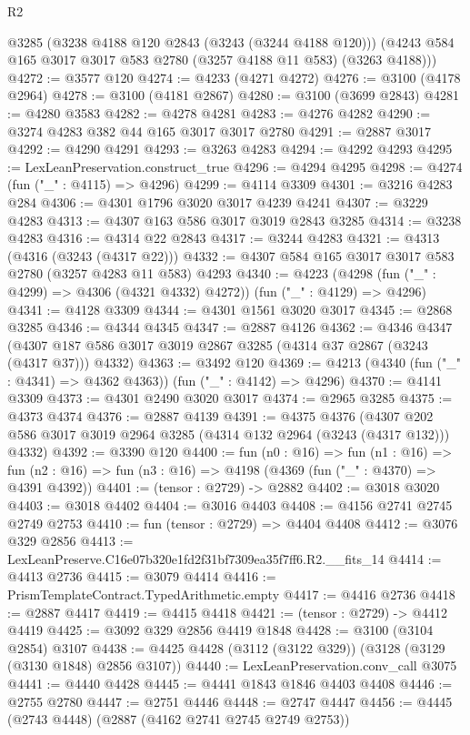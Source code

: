 \begin{lexlean}{R2}
\begin{coremodule}
      @3285
      (@3238 @4188 @120 @2843 (@3243 (@3244 @4188 @120)))
      (@4243 @584 @165 @3017 @3017 @583 @2780 (@3257 @4188 @11 @583) (@3263 @4188)))
@4272 := @3577 @120
@4274 := @4233 (@4271 @4272)
@4276 := @3100 (@4178 @2964)
@4278 := @3100 (@4181 @2867)
@4280 := @3100 (@3699 @2843)
@4281 := @4280 @3583
@4282 := @4278 @4281
@4283 := @4276 @4282
@4290 := @3274 @4283 @382 @44 @165 @3017 @3017 @2780
@4291 := @2887 @3017
@4292 := @4290 @4291
@4293 := @3263 @4283
@4294 := @4292 @4293
@4295 := LexLeanPreservation.construct_true
@4296 := @4294 @4295
@4298 := @4274 (fun ("_" : @4115) => @4296)
@4299 := @4114 @3309
@4301 := @3216 @4283 @284
@4306 := @4301 @1796 @3020 @3017 @4239 @4241
@4307 := @3229 @4283
@4313 := @4307 @163 @586 @3017 @3019 @2843 @3285
@4314 := @3238 @4283
@4316 := @4314 @22 @2843
@4317 := @3244 @4283
@4321 := @4313 (@4316 (@3243 (@4317 @22)))
@4332 := @4307 @584 @165 @3017 @3017 @583 @2780 (@3257 @4283 @11 @583) @4293
@4340 := @4223 (@4298 (fun ("_" : @4299) => @4306 (@4321 @4332) @4272)) (fun ("_" : @4129) => @4296)
@4341 := @4128 @3309
@4344 := @4301 @1561 @3020 @3017
@4345 := @2868 @3285
@4346 := @4344 @4345
@4347 := @2887 @4126
@4362 := @4346
    @4347
    (@4307 @187 @586 @3017 @3019 @2867 @3285 (@4314 @37 @2867 (@3243 (@4317 @37))) @4332)
@4363 := @3492 @120
@4369 := @4213 (@4340 (fun ("_" : @4341) => @4362 @4363)) (fun ("_" : @4142) => @4296)
@4370 := @4141 @3309
@4373 := @4301 @2490 @3020 @3017
@4374 := @2965 @3285
@4375 := @4373 @4374
@4376 := @2887 @4139
@4391 := @4375
    @4376
    (@4307 @202 @586 @3017 @3019 @2964 @3285 (@4314 @132 @2964 (@3243 (@4317 @132))) @4332)
@4392 := @3390 @120
@4400 := fun (n0 : @16) =>
  fun (n1 : @16) =>
  fun (n2 : @16) => fun (n3 : @16) => @4198 (@4369 (fun ("_" : @4370) => @4391 @4392))
@4401 := (tensor : @2729) -> @2882
@4402 := @3018 @3020
@4403 := @3018 @4402
@4404 := @3016 @4403
@4408 := @4156 @2741 @2745 @2749 @2753
@4410 := fun (tensor : @2729) => @4404 @4408
@4412 := @3076 @329 @2856
@4413 := LexLeanPreserve.C16e07b320e1fd2f31bf7309ea35f7ff6.R2.__fits_14
@4414 := @4413 @2736
@4415 := @3079 @4414
@4416 := PrismTemplateContract.TypedArithmetic.empty
@4417 := @4416 @2736
@4418 := @2887 @4417
@4419 := @4415 @4418
@4421 := (tensor : @2729) -> @4412 @4419
@4425 := @3092 @329 @2856 @4419 @1848
@4428 := @3100 (@3104 @2854) @3107
@4438 := @4425 @4428 (@3112 (@3122 @329)) (@3128 (@3129 (@3130 @1848) @2856 @3107))
@4440 := LexLeanPreservation.conv_call @3075
@4441 := @4440 @4428
@4445 := @4441 @1843 @1846 @4403 @4408
@4446 := @2755 @2780
@4447 := @2751 @4446
@4448 := @2747 @4447
@4456 := @4445 (@2743 @4448) (@2887 (@4162 @2741 @2745 @2749 @2753))

\end{coremodule}
\end{lexlean}
